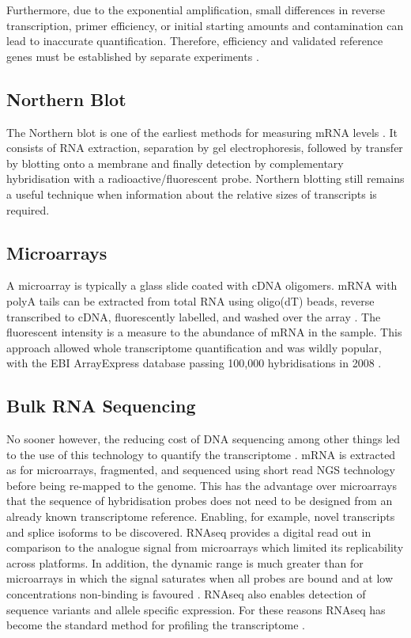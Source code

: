 Furthermore, due to the exponential amplification, small differences in reverse transcription, primer efficiency, or initial starting amounts and contamination can lead to inaccurate quantification. Therefore, efficiency and validated reference genes must be established by separate experiments \parencite{Bustin2009MIQE}.

\subsection{Northern Blot}
The Northern blot  is one of the earliest methods for measuring mRNA levels \parencite{Alwine1977Method}. It consists of RNA extraction, separation by gel electrophoresis, followed by transfer by blotting onto a membrane and finally detection by complementary hybridisation with a radioactive/fluorescent probe. Northern blotting still remains a useful technique when information about the relative sizes of transcripts is required.

\subsection{Microarrays}
A microarray is typically a glass slide coated with cDNA oligomers. mRNA with polyA tails can be extracted from total RNA using oligo(dT) beads, reverse transcribed to cDNA, fluorescently labelled, and washed over the array \parencite{Schena1995Quantitative, DeRisi1996Use, Schulze2001Navigating}. The fluorescent intensity is a measure to the abundance of mRNA in the sample. This approach allowed whole transcriptome quantification and was wildly popular, with the EBI ArrayExpress database passing 100,000 hybridisations in 2008 \parencite{Rustici2008Data}.

\subsection{Bulk RNA Sequencing}
No sooner however, the reducing cost of DNA sequencing among other things led to the use of this technology to quantify the transcriptome \parencite{Mortazavi2008Mapping, Cloonan2008Stem, Wilhelm2008Dynamic, Lister2008Highly, Nagalakshmi2008Transcriptional}. mRNA is extracted as for microarrays, fragmented, and sequenced using short read NGS technology before being re-mapped to the genome. This has the advantage over microarrays that the sequence of hybridisation probes does not need to be designed from an already known transcriptome reference. Enabling, for example, novel transcripts and splice isoforms to be discovered. RNAseq provides a digital read out in comparison to the analogue signal from microarrays which limited its replicability across platforms. In addition, the dynamic range is much greater than for microarrays in which the signal saturates when all probes are bound and at low concentrations non-binding is favoured \parencite{Zhao2014Comparison}. RNAseq also enables detection of sequence variants and allele specific expression. For these reasons RNAseq has become the standard method for profiling the transcriptome \parencite{Stark2019RNA}.

